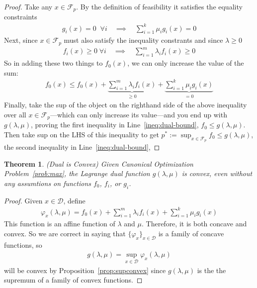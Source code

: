 \documentclass[12pt]{book}
\numberwithin{equation}{section} %
\theoremstyle{plain}
\newtheorem{thm}{Theorem}[section]
\theoremstyle{definition}
\theoremstyle{remark}
\newcommand{\sF}{\mathscr{F}}
\begin{document}
\begin{proof}
Take any $x\in \mathscr{F}_p$. By the definition of feasibility it
satisfies the equality constraints
\begin{align*}
  g_i(x)=0 \;\; \forall i
  \quad\implies\quad
  \sum_{i=1}^k \mu_i g_i(x) = 0
\end{align*}
Next, since $x\in\sF_p$ must also satisfy the inequality constrants and
since $\lambda\geq 0$
\begin{align*}
  f_i(x) \geq 0 \; \forall i
  \quad\implies\quad
  \sum_{i=1}^m \lambda_i f_i(x) \geq 0
\end{align*}
So in adding these two things to $f_0(x)$, we can only increase the
value of the sum:
\begin{align}
  f_0(x) \leq f_0(x)
  + \underbrace{\sum_{i=1}^m \lambda_if_i(x)}_{\geq 0}
  + \underbrace{\sum_{i=1}^k \mu_ig_i(x)}_{=0}
  \label{ineq:dual-bound-almost}
\end{align}
Finally, take the sup of the object on the righthand side of the above
inequality over all $x\in\sF_p$---which can only increase its
value---and you end up with $g(\lambda,\mu)$, proving the first
inequality in Line~\ref{ineq:dual-bound}, $f_0\leq g(\lambda,\mu)$.
Then take sup on the LHS of this inequality to get
$p^*:=\sup_{x\in\sF_p}f_0\leq g(\lambda,\mu)$, the second inequality in
Line~\ref{ineq:dual-bound},
\end{proof}

\begin{thm}{\emph{(Dual is Convex)}}
\label{thm:dual-convex}
Given Canonical Optimization Problem~\ref{prob:max}, the Lagrange dual
function $g(\lambda,\mu)$ is \emph{convex}, even without any assumtions
on functions $f_0$, $f_i$, or $g_i$.
\end{thm}
\begin{proof}
Given $x\in\mathcal{D}$, define
\begin{align*}
  \varphi_x(\lambda,\mu) = f_0(x)
    + \sum^m_{i=1} \lambda_i f_i(x)
    + \sum^k_{i=1} \mu_i g_i(x)
\end{align*}
This function is an affine function of $\lambda$ and $\mu$. Therefore,
it is both concave and convex. So we are correct in saying that
$\{\varphi_x\}_{x\in\mathcal{D}}$ is a family of concave functions, so
\begin{align*}
  g(\lambda,\mu) = \sup_{x\in\mathcal{D}} \varphi_x(\lambda,\mu)
\end{align*}
will be convex by Proposition~\ref{prop:supconvex} since
$g(\lambda,\mu)$ is the the supremum of a family of convex functions.

\end{proof}
\end{document}
